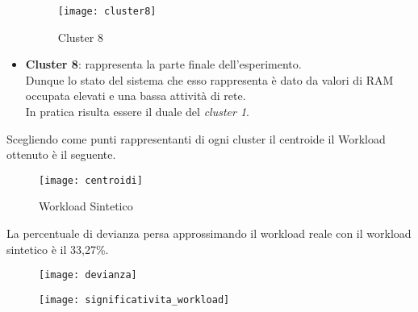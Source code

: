\begin{itemize}
  \begin{figure}[!htbp]
    \centering
    \texttt{[image: cluster8]}
    \caption{Cluster 8}
    \label{cluster8}
  \end{figure}

  \item \textbf{Cluster 8}: rappresenta la parte finale dell'esperimento.\\
   Dunque lo stato del sistema che esso rappresenta è dato da valori di RAM occupata elevati
   e una bassa attività di rete.\\
   In pratica risulta essere il duale del \textit{cluster 1}.\\

\end{itemize}
  \clearpage
Scegliendo come punti rappresentanti di ogni cluster il centroide il Workload
ottenuto è il seguente.
\begin{figure}[!htbp]
  \centering
  \texttt{[image: centroidi]}
  \caption{Workload Sintetico}
  \label{centroidi}
\end{figure}

La percentuale di devianza persa approssimando il workload reale con il workload
sintetico è il 33,27\%.

\begin{minipage}{\linewidth}
 \centering
 \begin{minipage}{0.48\linewidth}
   \begin{figure}[H]
     \texttt{[image: devianza]}
   \end{figure}
 \end{minipage}
 \begin{minipage}{0.48\linewidth}
   \begin{figure}[H]
     \texttt{[image: significativita\_workload]}
   \end{figure}
 \end{minipage}
\end{minipage}

